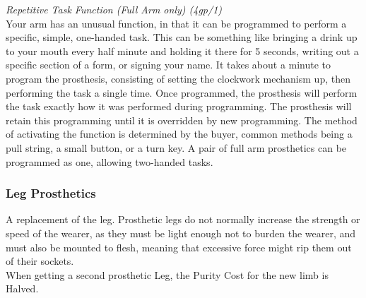 \documentclass[a4paper, twocolumn, openany]{book}
\newlength{\indentlen}
\newcommand{\tabto}[1]{\setlength{\leftskip}{#1\indentlen}}
\begin{document}
{	%

	{\slshape Repetitive Task Function (Full Arm only) (4gp/1)\\}
	Your arm has an unusual function, in that it can be programmed to perform a specific, simple,
	one-handed task. This can be something like bringing a drink up to your mouth every half
	minute and holding it there for 5 seconds, writing out a specific section of a form, or signing your
	name. It takes about a minute to program the prosthesis, consisting of setting the clockwork
	mechanism up, then performing the task a single time. Once programmed, the prosthesis will
	perform the task exactly how it was performed during programming. The prosthesis will retain
	this programming until it is overridden by new programming. The method of activating the
	function is determined by the buyer, common methods being a pull string, a small button, or a
	turn key. A pair of full arm prosthetics can be programmed as one, allowing two-handed tasks.\\

\tabto{0}\newpage
\subsubsection{Leg Prosthetics}
A replacement of the leg. Prosthetic legs do not normally increase the strength or speed of the
wearer, as they must be light enough not to burden the wearer, and must also be mounted to
flesh, meaning that excessive force might rip them out of their sockets.\\
When getting a second prosthetic Leg, the Purity Cost for the new limb is Halved.\\

}
\end{document}

